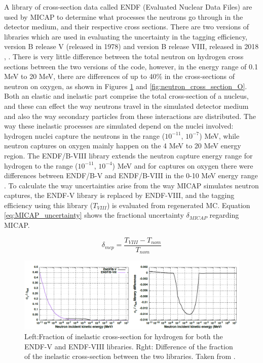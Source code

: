 A library of cross-section data called ENDF \cite{endf} (Evaluated Nuclear Data Files) are used by MICAP to determine what processes the neutrons go through in the detector medium, and their respective cross sections. There are two versions of libraries which are used in evaluating the uncertainty in the tagging efficiency, version B release V (released in 1978) and version B release VIII, released in 2018 \cite{endf8}, \cite{endf82}. There is very little difference between the total neutron on hydrogen cross sections between the two versions of the code, however, in the energy range of 0.1 MeV to 20 MeV, there are differences of up to 40\% in the cross-sections of neutron on oxygen, as shown in Figures \ref{fig:neutron_cross_section_H} and \ref{fig:neutron_cross_section_O}. Both an elastic and inelastic part comprise the total cross-section of a nucleus, and these can effect the way neutrons travel in the simulated detector medium and also the way secondary particles from these interactions are distributed. The way these inelastic processes are simulated depend on the nuclei involved: hydrogen nuclei capture the neutrons in the range ($10^{-11}$, $10^{-7}$) MeV, while neutron captures on oxygen mainly happen on the 4 MeV to 20 MeV energy region. The ENDF/B-VIII library extends the neutron capture energy range for hydrogen to the range ($10^{-11}$, $10^{-4}$) MeV and for captures on oxygen there were differences between ENDF/B-V and ENDF/B-VIII in the 0-10 MeV energy range \cite{akutsu_thesis}.  To calculate the way uncertainties arise from the way MICAP simulates neutron captures, the ENDF-V library is replaced by ENDF-VIII, and the tagging efficiency using this library ($T_{VIII}$) is evaluated from regenerated MC. Equation \ref{eq:MICAP_uncertainty} shows the fractional uncertainty $\delta_{MICAP}$ regarding MICAP.  

\begin{equation}
    \delta_{m c p}=\frac{T_{V I I I}-T_{n o m}}{T_{n o m}}
\label{eq:MICAP_uncertainty}
\end{equation}

\begin{figure}[!htb]
    \centering
    \includegraphics[width=\textwidth]{Figures/neutron_cross_section_endf_H.PNG}
\caption{Left:Fraction of inelastic cross-section for hydrogen for both the ENDF-V and ENDF-VIII libraries. Rght: Difference of the fraction of the inelastic cross-section between the two libraries. Taken from \cite{tn415_fiacob}.}
\label{fig:neutron_cross_section_H}
\end{figure}

